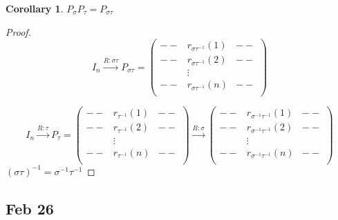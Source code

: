 \documentclass[12pt]{article}
\newtheorem{corollary}{Corollary}[subsection]
\begin{document}
\begin{corollary}
	$P_{\sigma} P_{\tau} = P_{\sigma \tau}$
\end{corollary}
\begin{proof}
	\[
		I_n \overset{R:\sigma \tau} {\longrightarrow} P_{\sigma \tau}
		= 
		\begin{pmatrix}
			-- & r_{\sigma \tau^{-1}}(1) & --\\
			-- & r_{\sigma \tau^{-1}}(2) & --\\
			   & \vdots & \\
			-- & r_{\sigma \tau^{-1}}(n) & --\\
		\end{pmatrix}
	\]
	
	\[
		I_n \overset{R:\tau} {\longrightarrow} P_{\tau}
		= 
		\begin{pmatrix}
			-- & r_{\tau^{-1}}(1) & --\\
			-- & r_{\tau^{-1}}(2) & --\\
			   & \vdots & \\
			-- & r_{\tau^{-1}}(n) & --\\
		\end{pmatrix}
		\overset{R:\sigma} {\longrightarrow}
		\begin{pmatrix}
			-- & r_{\sigma^{-1} \tau^{-1}}(1) & --\\
			-- & r_{\sigma^{-1}\tau^{-1}}(2) & --\\
			   & \vdots & \\
			-- & r_{\sigma^{-1}\tau^{-1}}(n) & --\\
		\end{pmatrix}
	\]
	$(\sigma \tau)^{-1} = \sigma^{-1} \tau^{-1}$
\end{proof}



	\newpage
	\subsection{Feb 26}
\end{document}
